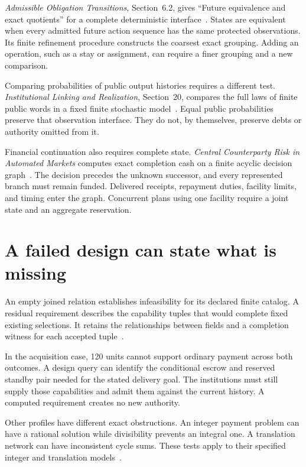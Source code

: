 \documentclass{momentum}
\begin{document}
\emph{Admissible Obligation Transitions}, Section~6.2, gives ``Future equivalence and exact quotients'' for a complete deterministic interface~\cite{transitions}.
States are equivalent when every admitted future action sequence has the same protected observations.
Its finite refinement procedure constructs the coarsest exact grouping.
Adding an operation, such as a stay or assignment, can require a finer grouping and a new comparison.

Comparing probabilities of public output histories requires a different test.
\emph{Institutional Linking and Realization}, Section~20, compares the full laws of finite public words in a fixed finite stochastic model~\cite{linking}.
Equal public probabilities preserve that observation interface.
They do not, by themselves, preserve debts or authority omitted from it.

Financial continuation also requires complete state.
\emph{Central Counterparty Risk in Automated Markets} computes exact completion cash on a finite acyclic decision graph~\cite{risk}.
The decision precedes the unknown successor, and every represented branch must remain funded.
Delivered receipts, repayment duties, facility limits, and timing enter the graph.
Concurrent plans using one facility require a joint state and an aggregate reservation.

\section{A failed design can state what is missing}
\label{sec:obstructions}

An empty joined relation establishes infeasibility for its declared finite catalog.
A residual requirement describes the capability tuples that would complete fixed existing selections.
It retains the relationships between fields and a completion witness for each accepted tuple~\cite[Section~10]{linking}.

In the acquisition case, 120 units cannot support ordinary payment across both outcomes.
A design query can identify the conditional escrow and reserved standby pair needed for the stated delivery goal.
The institutions must still supply those capabilities and admit them against the current history.
A computed requirement creates no new authority.

Other profiles have different exact obstructions.
An integer payment problem can have a rational solution while divisibility prevents an integral one.
A translation network can have inconsistent cycle sums.
These tests apply to their specified integer and translation models~\cite[Sections~13--14]{linking}.
\end{document}
